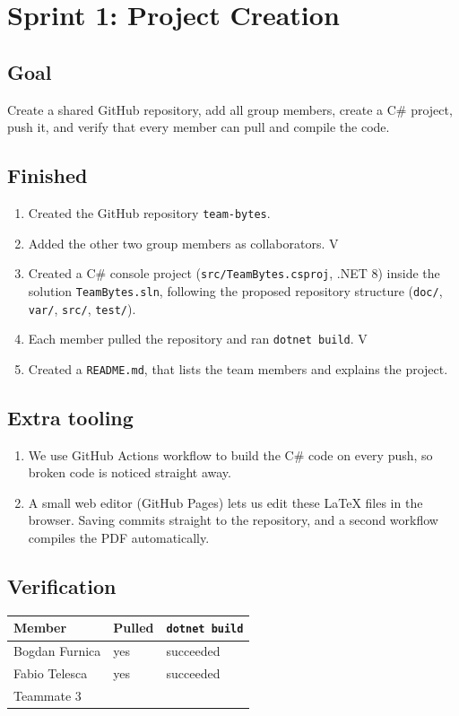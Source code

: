 \section{Sprint 1: Project Creation}

\subsection{Goal}
Create a shared GitHub repository, add all group members, create a C\# project,
push it, and verify that every member can pull and compile the code.

\subsection{Finished}
\begin{enumerate}
  \item Created the GitHub repository \texttt{team-bytes}.
  \item Added the other two group members as collaborators. V 
  \item Created a C\# console project (\texttt{src/TeamBytes.csproj}, .NET 8) inside the
        solution \texttt{TeamBytes.sln}, following the proposed repository structure
        (\texttt{doc/}, \texttt{var/}, \texttt{src/}, \texttt{test/}).
  \item Each member pulled the repository and ran \texttt{dotnet build}. V 
  \item Created a \texttt{README.md}, that lists the team members and explains the project.
\end{enumerate}

\subsection{Extra tooling}
\begin{enumerate}
  \item We use GitHub Actions workflow to build the C\# code on every push, so broken code
        is noticed straight away.
  \item A small web editor (GitHub Pages) lets us edit these \LaTeX{} files in the
        browser. Saving commits straight to the repository, and a second workflow
        compiles the PDF automatically.
\end{enumerate}

\subsection{Verification}
\begin{tabular}{@{}lll@{}}
  \toprule
  Member & Pulled & \texttt{dotnet build} \\
  \midrule
  Bogdan Furnica & yes & succeeded \\
  Fabio Telesca & yes & succeeded\\
  Teammate 3     &     &           \\
  \bottomrule
\end{tabular}
